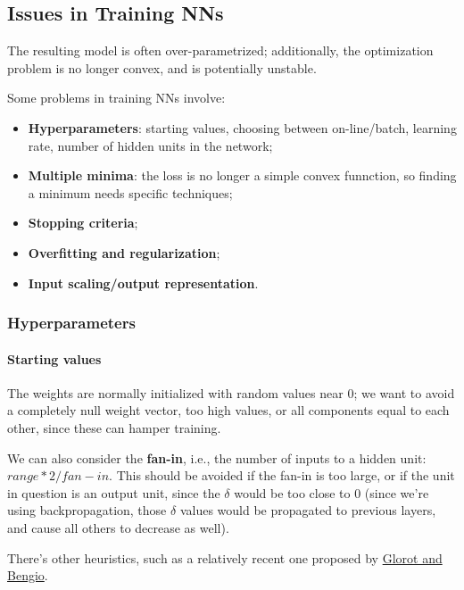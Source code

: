 \subsection{Issues in Training NNs}

The resulting model is often over-parametrized; additionally, the optimization problem is no longer convex, and is potentially unstable.

Some problems in training NNs involve:
\begin{itemize}
    \item \textbf{Hyperparameters}: starting values, choosing between on-line/batch, learning rate, number of hidden units in the network;

    \item \textbf{Multiple minima}: the loss is no longer a simple convex funnction, so finding a minimum needs specific techniques;

    \item \textbf{Stopping criteria};

    \item \textbf{Overfitting and regularization};

    \item \textbf{Input scaling/output representation}.
\end{itemize}

\subsubsection{Hyperparameters}

\paragraph{Starting values}

The weights are normally initialized with random values near 0; we want to avoid a completely null weight vector, too high values, or all components equal to each other, since these can hamper training.

We can also consider the \textbf{fan-in}, i.e., the number of inputs to a hidden unit: $range * 2 /fan-in$. This should be avoided if the fan-in is too large, or if the unit in question is an output unit, since the $\delta$ would be too close to 0 (since we're using backpropagation, those $\delta$ values would be propagated to previous layers, and cause all others to decrease as well).

There's other heuristics, such as a relatively recent one proposed by \href{https://proceedings.mlr.press/v9/glorot10a/glorot10a.pdf}{Glorot and Bengio}.

